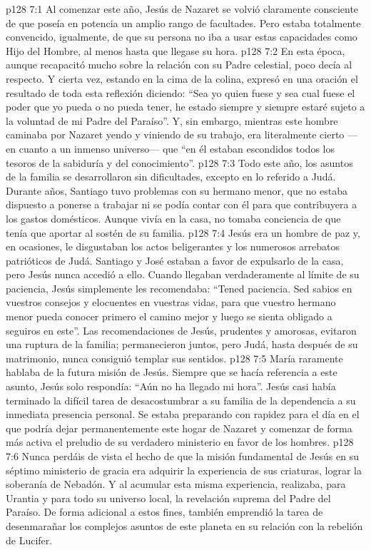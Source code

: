 \vs p128 7:1 Al comenzar este año, Jesús de Nazaret se volvió claramente consciente de que poseía en potencia un amplio rango de facultades. Pero estaba totalmente convencido, igualmente, de que su persona no iba a usar estas capacidades como Hijo del Hombre, al menos hasta que llegase su hora.
\vs p128 7:2 En esta época, aunque recapacitó mucho sobre la relación con su Padre celestial, poco decía al respecto. Y cierta vez, estando en la cima de la colina, expresó en una oración el resultado de toda esta reflexión diciendo: “Sea yo quien fuese y sea cual fuese el poder que yo pueda o no pueda tener, he estado siempre y siempre estaré sujeto a la voluntad de mi Padre del Paraíso”. Y, sin embargo, mientras este hombre caminaba por Nazaret yendo y viniendo de su trabajo, era literalmente cierto ---en cuanto a un inmenso universo--- que “en él estaban escondidos todos los tesoros de la sabiduría y del conocimiento”.
\vs p128 7:3 \pc Todo este año, los asuntos de la familia se desarrollaron sin dificultades, excepto en lo referido a Judá. Durante años, Santiago tuvo problemas con su hermano menor, que no estaba dispuesto a ponerse a trabajar ni se podía contar con él para que contribuyera a los gastos domésticos. Aunque vivía en la casa, no tomaba conciencia de que tenía que aportar al sostén de su familia.
\vs p128 7:4 Jesús era un hombre de paz y, en ocasiones, le disgustaban los actos beligerantes y los numerosos arrebatos patrióticos de Judá. Santiago y José estaban a favor de expulsarlo de la casa, pero Jesús nunca accedió a ello. Cuando llegaban verdaderamente al límite de su paciencia, Jesús simplemente les recomendaba: “Tened paciencia. Sed sabios en vuestros consejos y elocuentes en vuestras vidas, para que vuestro hermano menor pueda conocer primero el camino mejor y luego se sienta obligado a seguiros en este”. Las recomendaciones de Jesús, prudentes y amorosas, evitaron una ruptura de la familia; permanecieron juntos, pero Judá, hasta después de su matrimonio, nunca consiguió templar sus sentidos.
\vs p128 7:5 María raramente hablaba de la futura misión de Jesús. Siempre que se hacía referencia a este asunto, Jesús solo respondía: “Aún no ha llegado mi hora”. Jesús casi había terminado la difícil tarea de desacostumbrar a su familia de la dependencia a su inmediata presencia personal. Se estaba preparando con rapidez para el día en el que podría dejar permanentemente este hogar de Nazaret y comenzar de forma más activa el preludio de su verdadero ministerio en favor de los hombres.
\vs p128 7:6 Nunca perdáis de vista el hecho de que la misión fundamental de Jesús en su séptimo ministerio de gracia era adquirir la experiencia de sus criaturas, lograr la soberanía de Nebadón. Y al acumular esta misma experiencia, realizaba, para Urantia y para todo su universo local, la revelación suprema del Padre del Paraíso. De forma adicional a estos fines, también emprendió la tarea de desenmarañar los complejos asuntos de este planeta en su relación con la rebelión de Lucifer.
